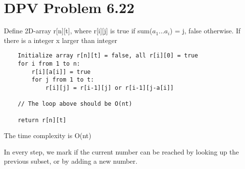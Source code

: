 \documentclass{article}
\def\math#1{$#1$}
\begin{document}
\section{DPV Problem 6.22} 
Define 2D-array r[n][t], where r[i][j] is true if sum(\math{a_1}...\math{a_i}) = j, false otherwise.
If there is a integer x larger than integer  
\begin{verbatim}
    Initialize array r[n][t] = false, all r[i][0] = true
    for i from 1 to n:
        r[i][a[i]] = true
        for j from 1 to t:
            r[i][j] = r[i-1][j] or r[i-1][j-a[i]] 
    
    // The loop above should be O(nt)
    
    return r[n][t]
\end{verbatim}

The time complexity is O(nt)

In every step, we mark if the current number can be reached by looking up the previous subset, or by adding a new number.
\end{document}
